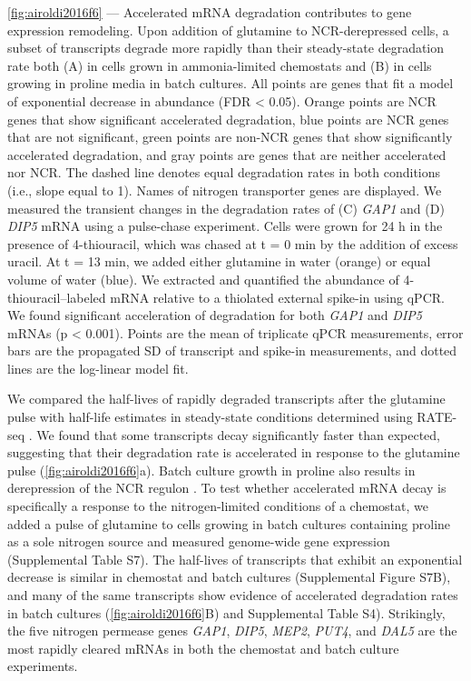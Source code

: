 \begin{framed}
\noindent
\autoref{fig:airoldi2016f6} ---
Accelerated mRNA degradation contributes
to gene expression remodeling. Upon addition of glutamine to
NCR-derepressed cells, a subset of transcripts degrade more rapidly
than their steady-state degradation rate both (A) in cells grown in
ammonia-limited chemostats and (B) in cells growing in proline media
in batch cultures. All points are genes that fit a model of
exponential decrease in abundance (FDR < 0.05). Orange points are NCR
genes that show significant accelerated degradation, blue points are
NCR genes that are not significant, green points are non-NCR genes
that show significantly accelerated degradation, and gray points are
genes that are neither accelerated nor NCR. The dashed line denotes
equal degradation rates in both conditions (i.e., slope equal to 1).
Names of nitrogen transporter genes are displayed. We measured the
transient changes in the degradation rates of (C) \textit{GAP1} and (D) \textit{DIP5}
mRNA using a pulse-chase experiment. Cells were grown for 24 h in the
presence of 4-thiouracil, which was chased at t = 0 min by the
addition of excess uracil. At t = 13 min, we added either glutamine in
water (orange) or equal volume of water (blue). We extracted and
quantified the abundance of 4-thiouracil–labeled mRNA relative to a
thiolated external spike-in using qPCR. We found significant
acceleration of degradation for both \textit{GAP1} and \textit{DIP5} mRNAs (p < 0.001).
Points are the mean of triplicate qPCR measurements, error bars are
the propagated SD of transcript and spike-in measurements, and dotted
lines are the log-linear model fit.  
\end{framed}

We compared the half-lives of rapidly degraded transcripts
after the glutamine pulse with half-life estimates in steady-state
conditions determined using RATE-seq 
\parencite{neymotin2014determination}. We found
that some transcripts decay significantly faster than expected,
suggesting that their degradation rate is accelerated in response to
the glutamine pulse (\autoref{fig:airoldi2016f6}a). 
Batch culture growth in proline also
results in derepression of the NCR regulon 
\parencite{godard2007effect}. To
test whether accelerated mRNA decay is specifically a response to the
nitrogen-limited conditions of a chemostat, we added a pulse of
glutamine to cells growing in batch cultures containing proline as a
sole nitrogen source and measured genome-wide gene expression
(Supplemental Table S7). The half-lives of transcripts that exhibit an
exponential decrease is similar in chemostat and batch cultures
(Supplemental Figure S7B), and many of the same transcripts show
evidence of accelerated degradation rates in batch cultures 
(\autoref{fig:airoldi2016f6}B)
and Supplemental Table S4). Strikingly, the five nitrogen permease
genes \textit{GAP1}, \textit{DIP5}, \textit{MEP2}, 
\textit{PUT4}, and \textit{DAL5} are the most rapidly cleared
mRNAs in both the chemostat and batch culture experiments.  

